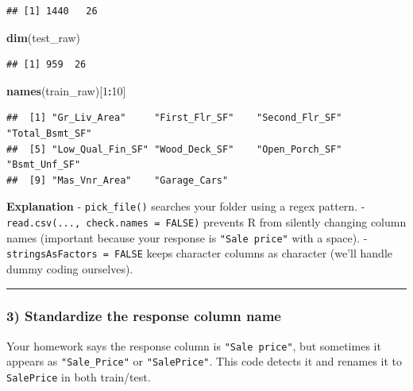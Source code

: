 \documentclass[
]{article}
\newenvironment{Shaded}{\begin{snugshade}}{\end{snugshade}}
\newcommand{\DecValTok}[1]{\textcolor[rgb]{0.00,0.00,0.81}{#1}}
\newcommand{\FunctionTok}[1]{\textcolor[rgb]{0.13,0.29,0.53}{\textbf{#1}}}
\newcommand{\NormalTok}[1]{#1}
\newcommand{\SpecialCharTok}[1]{\textcolor[rgb]{0.81,0.36,0.00}{\textbf{#1}}}
\begin{document}
\begin{verbatim}
## [1] 1440   26
\end{verbatim}

\begin{Shaded}
\begin{Highlighting}[]
\FunctionTok{dim}\NormalTok{(test\_raw)}
\end{Highlighting}
\end{Shaded}

\begin{verbatim}
## [1] 959  26
\end{verbatim}

\begin{Shaded}
\begin{Highlighting}[]
\FunctionTok{names}\NormalTok{(train\_raw)[}\DecValTok{1}\SpecialCharTok{:}\DecValTok{10}\NormalTok{]}
\end{Highlighting}
\end{Shaded}

\begin{verbatim}
##  [1] "Gr_Liv_Area"     "First_Flr_SF"    "Second_Flr_SF"   "Total_Bsmt_SF"  
##  [5] "Low_Qual_Fin_SF" "Wood_Deck_SF"    "Open_Porch_SF"   "Bsmt_Unf_SF"    
##  [9] "Mas_Vnr_Area"    "Garage_Cars"
\end{verbatim}

\textbf{Explanation} - \texttt{pick\_file()} searches your folder using
a regex pattern. - \texttt{read.csv(...,\ check.names\ =\ FALSE)}
prevents R from silently changing column names (important because your
response is \texttt{"Sale\ price"} with a space). -
\texttt{stringsAsFactors\ =\ FALSE} keeps character columns as character
(we'll handle dummy coding ourselves).

\begin{center}\rule{0.5\linewidth}{0.5pt}\end{center}

\subsubsection{3) Standardize the response column
name}\label{standardize-the-response-column-name}

Your homework says the response column is \texttt{"Sale\ price"}, but
sometimes it appears as \texttt{"Sale\_Price"} or \texttt{"SalePrice"}.
This code detects it and renames it to \texttt{SalePrice} in both
train/test.
\end{document}
